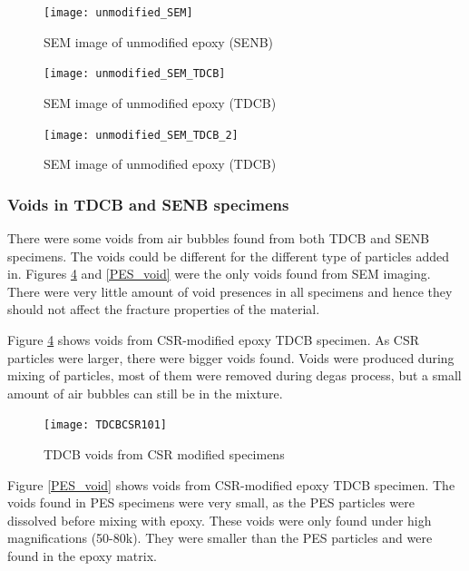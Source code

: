 \documentclass[numbers=noendperiod,chapterprefix=on]{icldt} %
\begin{document}
{\begin{figure}[!htpb]
\centering
\texttt{[image: unmodified\_SEM]}
\caption{SEM image of unmodified epoxy (SENB)} \label{unmodified_SEM}
\end{figure}
\FloatBarrier

\begin{figure}[!htpb]
\centering
\texttt{[image: unmodified\_SEM\_TDCB]}
\caption{SEM image of unmodified epoxy (TDCB)} \label{unmodified_SEM_TDCB}
\end{figure}
\FloatBarrier

\begin{figure}[!htpb]
\centering
\texttt{[image: unmodified\_SEM\_TDCB\_2]}
\caption{SEM image of unmodified epoxy (TDCB)} \label{unmodified_SEM_TDCB_2}
\end{figure}
\FloatBarrier


\subsubsection{Voids in TDCB and SENB specimens}
There were some voids from air bubbles found from both TDCB and SENB specimens.
The voids could be different for the different type of particles added in.
Figures \ref{TDCBCSR101} and \ref{PES_void} were the only voids found from SEM imaging. There were very little amount of void presences in all specimens and hence they should not affect the fracture properties of the material.

Figure \ref{TDCBCSR101} shows voids from CSR-modified epoxy TDCB specimen. As CSR particles were larger, there were bigger voids found. Voids were produced during mixing of particles, most of them were removed during degas process, but a small amount of air bubbles can still be in the mixture.
 
\begin{figure}[!htpb]
\centering
\texttt{[image: TDCBCSR101]}
\caption{TDCB voids from CSR modified specimens} \label{TDCBCSR101}
\end{figure}
\FloatBarrier

Figure \ref{PES_void} shows voids from CSR-modified epoxy TDCB specimen. The voids found in PES specimens were very small, as the PES particles were dissolved before mixing with epoxy. These voids were only found under high magnifications (50-80k). They were smaller than the PES particles and were found in the epoxy matrix.
  
}
\end{document}
